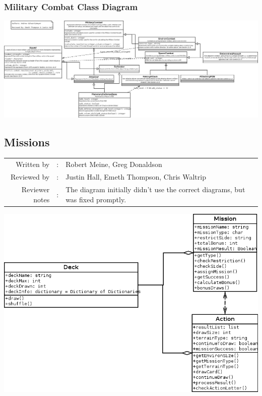 \documentclass[12pt,letterpaper]{article}
\begin{document}
		\subsubsection{Military Combat Class Diagram}
		\includegraphics[width=\textwidth,height=\textheight,keepaspectratio]{./images/military_combat}
	\subsection{Missions}
	\begin{tabularx}{\linewidth}{rcX}
				Written by & : & Robert Meine, Greg Donaldson \\
				Reviewed by & : & Justin Hall, Emeth Thompson, Chris Waltrip \\
				Reviewer notes & : & The diagram initially didn't use the correct diagrams, but was fixed promptly. 
	\end{tabularx}
		\includegraphics[width=\textwidth,height=\textheight,keepaspectratio]{./images/missions}
\end{document}
